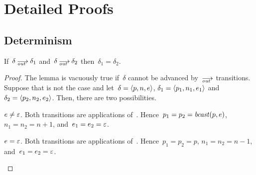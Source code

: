 \section{Detailed Proofs}
\label{sec.proofs}

\subsection*{Determinism}


\begin{lemma}
  \label{lem.det-out}
  If~$\delta\out\delta_1$ and~$\delta\out\delta_2$ then~$\delta_1=\delta_2$.
\end{lemma}
\begin{proof}
  The lemma is vacuously true if~$\delta$ cannot be advanced by~$\out$
  transitions.  Suppose that is not the case and let~$\delta=\<p,n,e>$,
  $\delta_1=\<p_1,n_1,e_1>$ and~$\delta_2=\<p_2,n_2,e_2>$.  Then, there are
  two possibilities.
  \begin{case}
    $e\ne\varepsilon$.  Both transitions are applications of~.
    Hence~$p_1=p_2=\operatorname{\mathit{bcast}}(p,e)$, $n_1=n_2=n+1$, and~$e_1=e_2=\varepsilon$.
  \end{case}
  \begin{case}
    $e=\varepsilon$.  Both transitions are applications of~.
    Hence~$p_1=p_2=p$, $n_1=n_2=n-1$, and~$e_1=e_2=\varepsilon$.\qedhere
  \end{case}
\end{proof}



